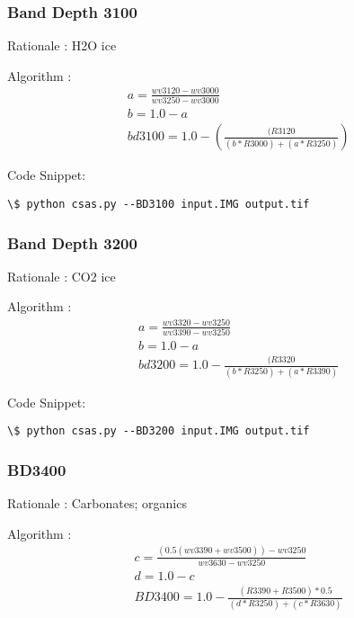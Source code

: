 \documentclass[letterpaper,10pt,english]{sphinxmanual}
\begin{document}
\subsubsection{Band Depth 3100}
\label{Algorithms:band-depth-3100}
Rationale : H2O ice

Algorithm : $$\begin{aligned}
& a = \frac{wv3120 - wv3000}{wv3250 - wv3000} \nonumber\\
& b = 1.0 - a \nonumber\\
& bd3100 = 1.0 - (\frac{(R3120}{(b*R3000)+(a*R3250)})
\end{aligned}$$

Code Snippet:

\begin{Verbatim}[commandchars=\\\{\}]
\$ python csas.py --BD3100 input.IMG output.tif
\end{Verbatim}


\subsubsection{Band Depth 3200}
\label{Algorithms:band-depth-3200}
Rationale : CO2 ice

Algorithm : $$\begin{aligned}
& a = \frac{wv3320 - wv3250}{wv3390 - wv3250} \nonumber\\
& b = 1.0 - a \nonumber\\
& bd3200 = 1.0 - \frac{(R3320}{(b*R3250)+(a*R3390)}
\end{aligned}$$

Code Snippet:

\begin{Verbatim}[commandchars=\\\{\}]
\$ python csas.py --BD3200 input.IMG output.tif
\end{Verbatim}


\subsubsection{BD3400}
\label{Algorithms:bd3400}
Rationale : Carbonates; organics

Algorithm : $$\begin{aligned}
& c = \frac{(0.5(wv3390+wv3500))-wv3250}{wv3630-wv3250}\nonumber\\
& d = 1.0 - c\nonumber\\
& BD3400 = 1.0 - \frac{(R3390 + R3500)*0.5}{(d*R3250)+(c*R3630)}
\end{aligned}$$
\end{document}
